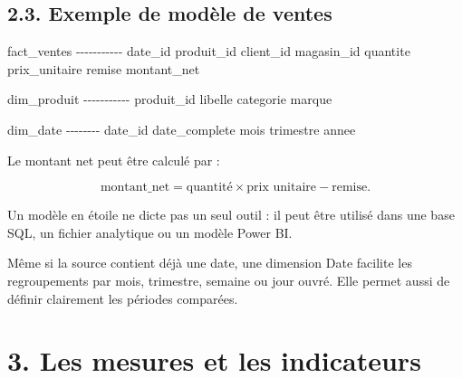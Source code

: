 \documentclass[
  french,
  letterpaper,
  open=any]{scrbook}
\newenvironment{Shaded}{\begin{snugshade}}{\end{snugshade}}
\newcommand{\NormalTok}[1]{\textcolor[rgb]{0.00,0.23,0.31}{#1}}
\theoremstyle{definition}
\theoremstyle{definition}
\theoremstyle{remark}
\begin{document}
\subsection{2.3. Exemple de modèle de
ventes}\label{exemple-de-moduxe8le-de-ventes}

\begin{Shaded}
\begin{Highlighting}[]
\NormalTok{fact\_ventes}
\NormalTok{{-}{-}{-}{-}{-}{-}{-}{-}{-}{-}{-}}
\NormalTok{date\_id}
\NormalTok{produit\_id}
\NormalTok{client\_id}
\NormalTok{magasin\_id}
\NormalTok{quantite}
\NormalTok{prix\_unitaire}
\NormalTok{remise}
\NormalTok{montant\_net}

\NormalTok{dim\_produit}
\NormalTok{{-}{-}{-}{-}{-}{-}{-}{-}{-}{-}{-}}
\NormalTok{produit\_id}
\NormalTok{libelle}
\NormalTok{categorie}
\NormalTok{marque}

\NormalTok{dim\_date}
\NormalTok{{-}{-}{-}{-}{-}{-}{-}{-}}
\NormalTok{date\_id}
\NormalTok{date\_complete}
\NormalTok{mois}
\NormalTok{trimestre}
\NormalTok{annee}
\end{Highlighting}
\end{Shaded}

Le montant net peut être calculé par :

\[
\text{montant\_net}
=\text{quantité}\times\text{prix unitaire}-\text{remise}.
\]

Un modèle en étoile ne dicte pas un seul outil : il peut être utilisé
dans une base SQL, un fichier analytique ou un modèle Power BI.

\begin{tcolorbox}[enhanced jigsaw, arc=.35mm, bottomrule=.15mm, bottomtitle=1mm, breakable, colback=white, colbacktitle=quarto-callout-note-color!10!white, colframe=quarto-callout-note-color-frame, coltitle=black, left=2mm, leftrule=.75mm, opacityback=0, opacitybacktitle=0.6, rightrule=.15mm, title=\textcolor{quarto-callout-note-color}{\faInfo}\hspace{0.5em}{Le rôle de la dimension Date}, titlerule=0mm, toprule=.15mm, toptitle=1mm]

Même si la source contient déjà une date, une dimension Date facilite
les regroupements par mois, trimestre, semaine ou jour ouvré. Elle
permet aussi de définir clairement les périodes comparées.

\end{tcolorbox}

\section{3. Les mesures et les
indicateurs}\label{les-mesures-et-les-indicateurs}
\end{document}
